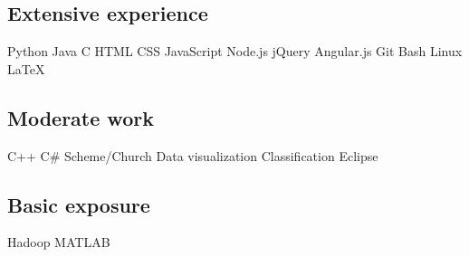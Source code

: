 \documentclass[]{deedy-resume-openfont}
\begin{document}
\begin{minipage}[t]{0.31\textwidth}
\subsection{Extensive experience}
Python \textbullet{} Java \textbullet{} C \textbullet{}  HTML \textbullet{} CSS \textbullet{} JavaScript \textbullet{} Node.js \textbullet{} jQuery \textbullet{} Angular.js \textbullet{} Git \textbullet{} Bash \textbullet{} Linux \textbullet{} \LaTeX 
\sectionsep
\subsection{Moderate work}
C++ \textbullet{} C\# \textbullet{} Scheme/Church \textbullet{} Data visualization \textbullet{} Classification \textbullet{} Eclipse
\sectionsep
\subsection{Basic exposure}
Hadoop \textbullet{} MATLAB

%
%

\end{minipage} 
\hfill
\end{document}
